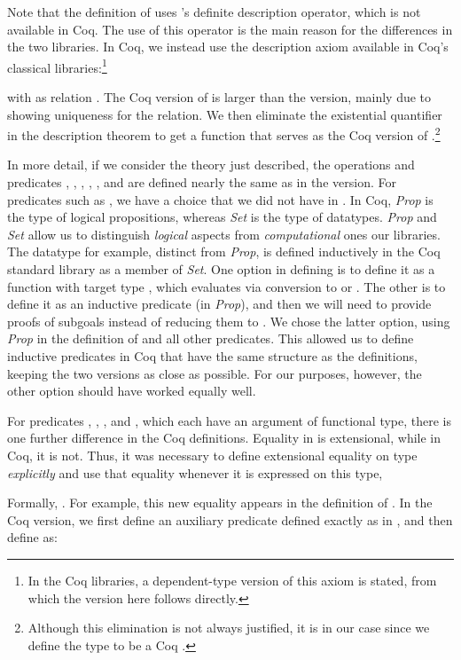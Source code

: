 \documentclass[final]{svjour3}
\begin{document}
Note that the definition of  uses \HOL's definite
description operator, which is not available in Coq.  The use of this
operator is the main reason for the differences in the two libraries.
In Coq, we instead use the description axiom available in Coq's
classical libraries:\footnote{In the Coq libraries, a dependent-type
version of this axiom is stated, from which the  version  here
follows directly.}

with  as relation .
The Coq version of \hybrid is larger than the \HOL version,
mainly due to showing uniqueness for the  relation.
We then eliminate the
existential quantifier in the description theorem to get a function
that serves as the Coq version of .\footnote{Although this
elimination is not always justified, it is in our case since we define
the type  to be a Coq .}

\newcommand{\Prop}{\textit{Prop}\xspace}
\newcommand{\Set}{\textit{Set}\xspace}

In more detail, if we consider the \HOL theory just described, the
operations and predicates , ,
, , , and 
are defined nearly the same as in the \HOL version.
For predicates such as , we have a choice that we did not
have in \HOL\@.  In Coq, \Prop is the type of logical propositions,
whereas \Set is the type of datatypes.
 \Prop and \Set allow us to distinguish \emph{logical} aspects from
\emph{computational} ones \wrt our libraries.  The datatype  for
example, distinct from \Prop, is defined inductively in the Coq
standard library as a member of \Set.  One option in defining
 is to define it as a function with target type ,
which evaluates via conversion to  or .  The other is to
define it as an inductive predicate (in \Prop), and then we will need
to provide proofs of  subgoals instead of reducing them to
.  We chose the latter option, using \Prop in the definition of
 and all other predicates.
This allowed us to define inductive predicates in Coq that have the
same structure as the \HOL definitions, keeping the two versions as
close as possible.  For our purposes, however, the other option
should have worked equally well.

For predicates , , ,
and , which each have an argument of functional type,
there is one further difference in the Coq definitions.  Equality in
\HOL is extensional, while in Coq, it is not.  Thus, it was necessary
to define extensional equality on type 
\emph{explicitly} and use that equality whenever it is expressed on
this type, \viz

Formally, .  For example,
this new equality appears in the definition of .  In the Coq
version, we first define an auxiliary predicate 
defined exactly as  in \HOL, and then define 
as:
 
\end{document}
